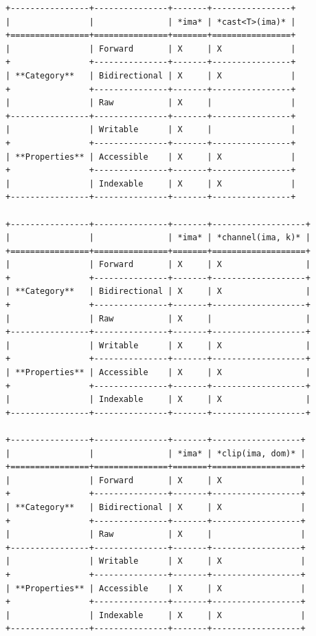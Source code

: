 \begin{verbatim}
+----------------+---------------+-------+----------------+
|                |               | *ima* | *cast<T>(ima)* |
+================+===============+=======+================+
|                | Forward       | X     | X              |
+                +---------------+-------+----------------+
| **Category**   | Bidirectional | X     | X              |
+                +---------------+-------+----------------+
|                | Raw           | X     |                |
+----------------+---------------+-------+----------------+
|                | Writable      | X     |                |
+                +---------------+-------+----------------+
| **Properties** | Accessible    | X     | X              |
+                +---------------+-------+----------------+
|                | Indexable     | X     | X              |
+----------------+---------------+-------+----------------+

+----------------+---------------+-------+-------------------+
|                |               | *ima* | *channel(ima, k)* |
+================+===============+=======+===================+
|                | Forward       | X     | X                 |
+                +---------------+-------+-------------------+
| **Category**   | Bidirectional | X     | X                 |
+                +---------------+-------+-------------------+
|                | Raw           | X     |                   |
+----------------+---------------+-------+-------------------+
|                | Writable      | X     | X                 |
+                +---------------+-------+-------------------+
| **Properties** | Accessible    | X     | X                 |
+                +---------------+-------+-------------------+
|                | Indexable     | X     | X                 |
+----------------+---------------+-------+-------------------+

+----------------+---------------+-------+------------------+
|                |               | *ima* | *clip(ima, dom)* |
+================+===============+=======+==================+
|                | Forward       | X     | X                |
+                +---------------+-------+------------------+
| **Category**   | Bidirectional | X     | X                |
+                +---------------+-------+------------------+
|                | Raw           | X     |                  |
+----------------+---------------+-------+------------------+
|                | Writable      | X     | X                |
+                +---------------+-------+------------------+
| **Properties** | Accessible    | X     | X                |
+                +---------------+-------+------------------+
|                | Indexable     | X     | X                |
+----------------+---------------+-------+------------------+


\end{verbatim}
